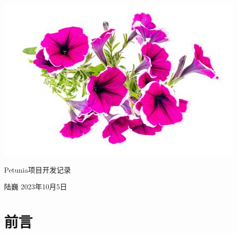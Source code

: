\documentclass[oneside,fontset=founder]{ctexbook}
\begin{document}
\begin{titlepage}%
\begin{center}
  \quad

  \vspace{2ex}

  \includegraphics[width=.4\textwidth]{images/cover.png}

  \vspace{4ex}

  \Huge\heiti Petunia项目开发记录\normalsize\normalfont

  \vspace{4ex}

  陆巍
  \vfill%
  2023年10月5日
\end{center}
\end{titlepage}


\frontmatter%


\chapter{前言}



\tableofcontents%


\mainmatter





\end{document}
